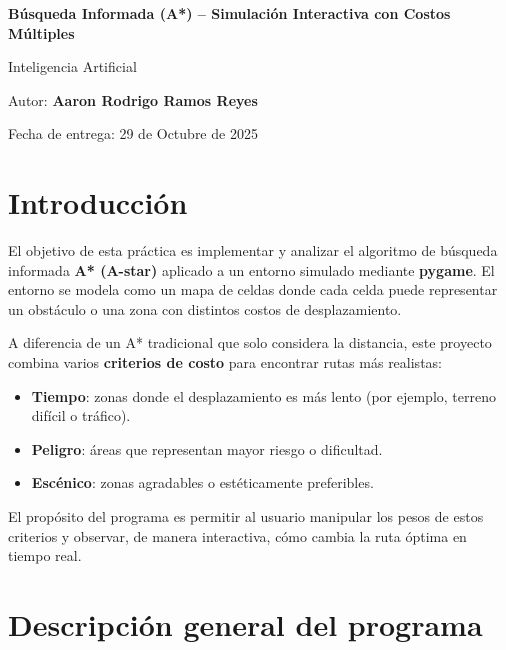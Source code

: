 \documentclass[12pt,a4paper]{article}
\begin{document}
\begin{titlepage}
\centering

{\huge\bfseries Búsqueda Informada (A*) – Simulación Interactiva con Costos Múltiples\par}
\vspace{1.5cm}
{\Large Inteligencia Artificial\par}
\vspace{1cm}
{\Large Autor: \textbf{Aaron Rodrigo Ramos Reyes}\par}
\vspace{0.5cm}
{\large Fecha de entrega: 29 de Octubre de 2025\par}
\vfill
\end{titlepage}

\section{Introducción}

El objetivo de esta práctica es implementar y analizar el algoritmo de búsqueda informada \textbf{A* (A-star)} aplicado a un entorno simulado mediante \textbf{pygame}.  
El entorno se modela como un mapa de celdas donde cada celda puede representar un obstáculo o una zona con distintos costos de desplazamiento.

A diferencia de un A* tradicional que solo considera la distancia, este proyecto combina varios \textbf{criterios de costo} para encontrar rutas más realistas:
\begin{itemize}
    \item \textbf{Tiempo}: zonas donde el desplazamiento es más lento (por ejemplo, terreno difícil o tráfico).
    \item \textbf{Peligro}: áreas que representan mayor riesgo o dificultad.
    \item \textbf{Escénico}: zonas agradables o estéticamente preferibles.
\end{itemize}

El propósito del programa es permitir al usuario manipular los pesos de estos criterios y observar, de manera interactiva, cómo cambia la ruta óptima en tiempo real.

\section{Descripción general del programa}
\end{document}
